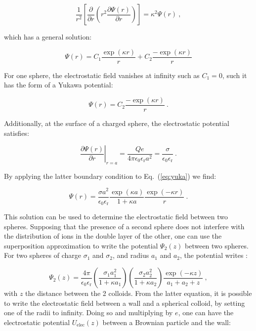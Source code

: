 \begin{equation}
	\frac{1}{r^2}\left[\frac{\partial}{\partial r} \left(r^2 \frac{\partial \Psi(r)}{\partial r}\right)\right] = \kappa^2  \Psi (r) ~,
\end{equation}

which has a general solution:

\begin{equation}
	\Psi(r) = C_1 \frac{\exp(\kappa r)}{r} + C_2 \frac{-\exp(\kappa r)}{r}
\end{equation}

For one sphere, the electrostatic field vanishes at infinity such as $C_1 = 0$, such it has the form of a Yukawa potential:

\begin{equation}
	\Psi (r) = C_2 \frac{-\exp(\kappa r)}{r} ~.
	\label{eq:yuka}
\end{equation}

Additionally, at the surface of a charged sphere, the electrostatic potential satisfies:

\begin{equation}
	\left. \frac{\partial{\Psi (r)}}{\partial r} \right|_{r=a} = \frac{Qe}{4 \pi \epsilon_0 \epsilon_\mathrm{r} a^2}  = \frac{\sigma}{\epsilon_0 \epsilon_\mathrm{r}} ~.
\end{equation}

By applying the latter boundary condition to Eq.~(\ref{eq:yuka}) we find:

\begin{equation}
	\Psi (r) = \frac{\sigma a^2}{\epsilon_0 \epsilon_\mathrm{r}} \frac{\exp (\kappa a)}{1 + \kappa a} \frac{\exp (-\kappa r)}{r} ~.
\end{equation}

This solution can be used to determine the electrostatic field between two spheres. Supposing that the presence of a second sphere does not interfere with the distribution of ions in the double layer of the other, one can use the superposition approximation to write the potential $\Psi _2 (z)$ between two spheres. For two spheres of charge $\sigma_1$ and $\sigma_2$, and radius $a_1$ and $a_2$, the potential writes \cite{bell_approximate_1970}:

\begin{equation}
	\Psi_2(z) = \frac{4\pi}{\epsilon_0 \epsilon_\mathrm{r}} 
	\left(
	\frac{\sigma_1 a_1 ^2}{1 + \kappa a_1}
	\right)
	\left(
	\frac{\sigma_2 a_2 ^2}{1 + \kappa a_2}
	\right)
	\frac{\exp(-\kappa z)}{a_1 + a_2 + z} ~,
\end{equation} 
with $z$ the distance between the 2 colloids.
From the latter equation, it is possible to write the electrostatic field between a wall and a spherical colloid, by setting one of the radii to infinity. Doing so and multiplying by $e$, one can have the electrostatic potential $U_\mathrm{elec}(z)$ between a Brownian particle and the wall:

